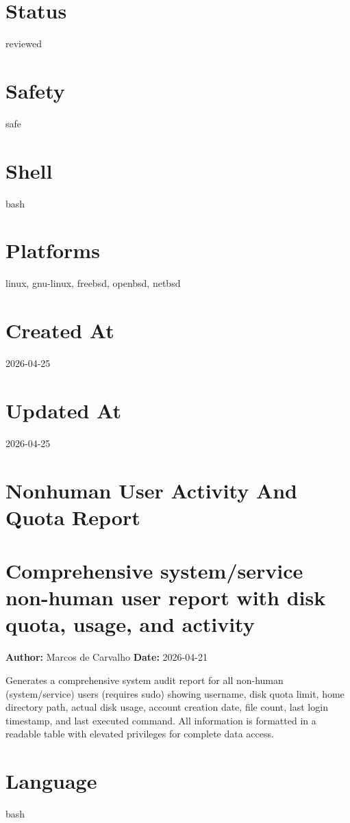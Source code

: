 \documentclass[openany]{book}
\begin{document}
\section*{Status}
reviewed

\section*{Safety}
safe

\section*{Shell}
bash

\section*{Platforms}
linux, gnu-linux, freebsd, openbsd, netbsd

\section*{Created At}
2026-04-25

\section*{Updated At}
2026-04-25

\section{Nonhuman User Activity And Quota Report}
\section*{Comprehensive system/service non-human user report with disk quota, usage, and activity}
\textbf{Author:} Marcos de Carvalho \hfill \textbf{Date:} 2026-04-21

\noindent Generates a comprehensive system audit report for all non-human (system/service) users (requires sudo) showing username, disk quota limit, home directory path, actual disk usage, account creation date, file count, last login timestamp, and last executed command. All information is formatted in a readable table with elevated privileges for complete data access.

\section*{Language}
bash
\end{document}
